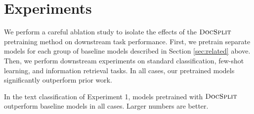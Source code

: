 \documentclass[11pt]{article}
\newcommand{\our}{\mbox{\textsc{DocSplit}}}
\newcommand{\ourbert}{$\our_{\mathrm{bert}}$}
\newcommand{\ourlong}{$\our_{\mathrm{long}}$}
\begin{document}
\section{Experiments}

\label{sec:experiments}


We perform a careful ablation study to isolate the effects of the $\our$ pretraining method on downstream task performance.
First, we pretrain separate models for each group of baseline models described in Section \ref{sec:related} above.
Then, we perform downstream experiments on standard classification, few-shot learning, and information retrieval tasks.
In all cases, our pretrained models significantly outperform prior work.



%
%
%
\begin{table}
    \centering
    
    \caption{
        In the text classification of Experiment 1, models pretrained with $\our$ outperform baseline models in all cases.
        Larger numbers are better.
    }
    \vspace{-3mm}
    \label{results}
\end{table}
\end{document}
